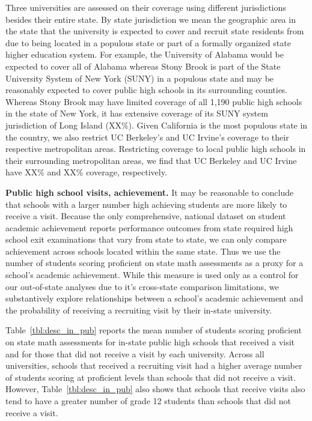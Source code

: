 \documentclass[twoside]{article}
\begin{document}
Three universities are assessed on their coverage using different jurisdictions besides their entire state. By state jurisdiction we mean the geographic area in the state that the university is expected to cover and recruit state residents from due to being located in a populous state or part of a formally organized state higher education system. For example, the University of Alabama would be expected to cover all of Alabama whereas Stony Brook is part of the State University System of New York (SUNY) in a populous state and may be reasonably expected to cover public high schools in its surrounding counties. Whereas Stony Brook may have limited coverage of all 1,190 public high schools in the state of New York, it has extensive coverage of its SUNY system jurisdiction of Long Island (XX\%). Given California is the most populous state in the country, we also restrict UC Berkeley's and UC Irvine's coverage to their respective metropolitan areas. Restricting coverage to local public high schools in their surrounding metropolitan areas, we find that UC Berkeley and UC Irvine have XX\% and XX\% coverage, respectively.

\textbf{Public high school visits, achievement.} It may be reasonable to conclude that schools with a larger number high achieving students are more likely to receive a visit. Because the only comprehensive, national dataset on student academic achievement reports performance outcomes from state required high school exit examinations that vary from state to state, we can only compare achievement across schools located within the same state. Thus we use the number of students scoring proficient on state math assessments as a proxy for a school's academic achievement. While this measure is used only as a control for our out-of-state analyses due to it's cross-state comparison limitations, we substantively explore relationships between a school's academic achievement and the probability of receiving a recruiting visit by their in-state university.

Table~\ref{tbl:desc_in_pub} reports the mean number of students scoring proficient on state math assessments for in-state public high schools that received a visit and for those that did not receive a visit by each university. Across all universities, schools that received a recruiting visit had a higher average number of students scoring at proficient levels than schools that did not receive a visit. However, Table~\ref{tbl:desc_in_pub} also shows that schools that receive visits also tend to have a greater number of grade 12 students than schools that did not receive a visit.
\end{document}
